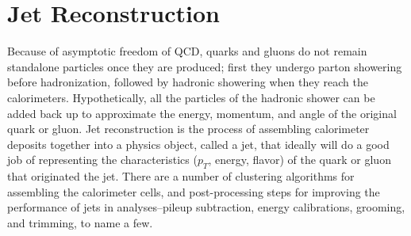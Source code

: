 %



\section{Jet Reconstruction}
\label{sec:jet_reco}
Because of asymptotic freedom of QCD, quarks and gluons do not remain standalone particles once they are produced;
first they undergo parton showering before hadronization, followed by hadronic showering 
when they reach the calorimeters. 
Hypothetically, all the particles of 
the hadronic shower can be added back up to approximate the energy, momentum, and angle of the original quark 
or gluon.  Jet reconstruction is the process of assembling calorimeter deposits together into a physics object, called a 
jet, that ideally will do a good job of representing the characteristics ($p_T$, energy, 
flavor) of the quark or gluon that originated the jet.  There are a number of clustering algorithms for 
assembling the calorimeter cells, and post-processing steps for improving the performance of jets in analyses--pileup 
subtraction, energy calibrations, grooming, and trimming, to name a few.  

